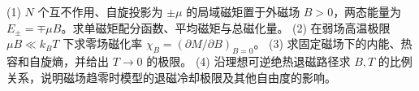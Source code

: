(1) \(N\) 个互不作用、自旋投影为 \(\pm\mu\) 的局域磁矩置于外磁场 \(B>0\)，两态能量为 \(E_\pm=\mp\mu B\)。求单磁矩配分函数、平均磁矩与总磁化量。
(2) 在弱场高温极限 \(\mu B\ll k_BT\) 下求零场磁化率 \(\chi_B=(\partial M/\partial B)_{B=0}\)。
(3) 求固定磁场下的内能、热容和自旋熵，并给出 \(T\to0\) 的极限。
(4) 沿理想可逆绝热退磁路径求 \(B,T\) 的比例关系，说明磁场趋零时模型的退磁冷却极限及其他自由度的影响。

